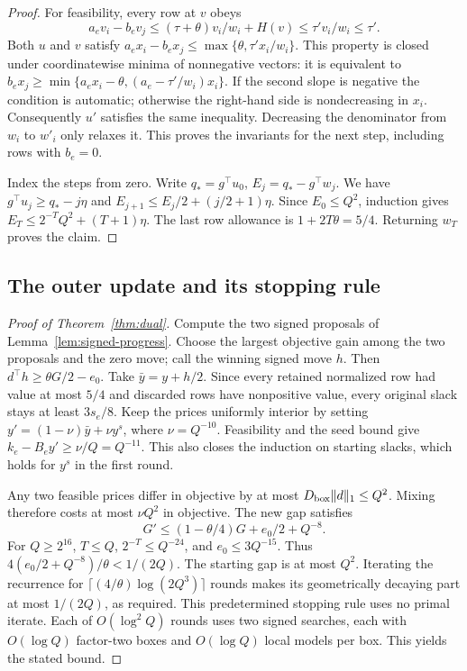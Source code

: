 \documentclass[11pt,letterpaper]{article}
\begin{document}
\begin{proof}
For feasibility, every row at $v$ obeys
\[
 a_e v_i-b_e v_j
 \le (\tau+\theta)v_i/w_i+H(v)
 \le \tau'v_i/w_i\le\tau' .
\]
Both $u$ and $v$ satisfy
$a_e x_i-b_e x_j\le\max\{\theta,\tau' x_i/w_i\}$.
This property is closed under coordinatewise minima of nonnegative vectors: it is equivalent to
$b_e x_j\ge\min\{a_e x_i-\theta,(a_e-\tau'/w_i)x_i\}$.
If the second slope is negative the condition is automatic; otherwise the right-hand side is nondecreasing in $x_i$. Consequently $u'$ satisfies the same inequality. Decreasing the denominator from $w_i$ to $w'_i$ only relaxes it. This proves the invariants for the next step, including rows with $b_e=0$.

Index the steps from zero. Write $q_*=g^\top u_0$, $E_j=q_*-g^\top w_j$. We have $g^\top u_j\ge q_*-j\eta$ and
$E_{j+1}\le E_j/2+(j/2+1)\eta$.
Since $E_0\le Q^2$, induction gives $E_T\le 2^{-T}Q^2+(T+1)\eta$. The last row allowance is $1+2T\theta=5/4$. Returning $w_T$ proves the claim.
\end{proof}

\subsection{The outer update and its stopping rule}

\begin{proof}[Proof of Theorem~\ref{thm:dual}]
Compute the two signed proposals of Lemma~\ref{lem:signed-progress}. Choose the largest objective gain among the two proposals and the zero move; call the winning signed move $h$. Then
$d^\top h\ge \theta G/2-e_0$. Take $\bar y=y+h/2$. Since every retained normalized row had value at most $5/4$ and discarded rows have nonpositive value, every original slack stays at least $3s_e/8$. Keep the prices uniformly interior by setting $y'=(1-\nu)\bar y+\nu y^s$, where $\nu=Q^{-10}$. Feasibility and the seed bound give $k_e-B_e y'\ge\nu/Q=Q^{-11}$. This also closes the induction on starting slacks, which holds for $y^s$ in the first round.

Any two feasible prices differ in objective by at most $D_{\rm box}\|d\|_1\le Q^2$. Mixing therefore costs at most $\nu Q^2$ in objective. The new gap satisfies
\[
 G'\le(1-\theta/4)G+e_0/2+Q^{-8}.
\]
For $Q\ge 2^{16}$, $T\le Q$, $2^{-T}\le Q^{-24}$, and $e_0\le 3Q^{-15}$. Thus $4(e_0/2+Q^{-8})/\theta<1/(2Q)$. The starting gap is at most $Q^2$. Iterating the recurrence for
$\lceil (4/\theta)\log(2Q^3)\rceil$ rounds makes its geometrically decaying part at most $1/(2Q)$, as required. This predetermined stopping rule uses no primal iterate. Each of $O(\log^2 Q)$ rounds uses two signed searches, each with $O(\log Q)$ factor-two boxes and $O(\log Q)$ local models per box. This yields the stated bound.
\end{proof}
\end{document}
